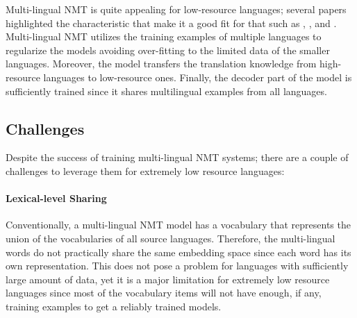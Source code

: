 Multi-lingual NMT is quite appealing for low-resource languages; several papers highlighted  the characteristic that make it a good fit for that  such as  , ,  and . Multi-lingual NMT utilizes the training examples of multiple languages to regularize the models  avoiding over-fitting to the limited data of the smaller languages. Moreover, the model transfers the translation knowledge from high-resource languages to low-resource ones. Finally, the decoder part of the model is sufficiently trained  since it shares  multilingual examples from all languages.

\subsection{Challenges}
Despite the success of training multi-lingual NMT systems; there are a couple of challenges to leverage them for extremely low resource languages:

\paragraph{Lexical-level Sharing} Conventionally, a multi-lingual NMT model has a vocabulary that represents the union of the vocabularies of all source languages. Therefore, the multi-lingual words do not practically share the same embedding space since each word has its own representation. This does not pose a problem for languages  with sufficiently large amount of  data, yet it is a major limitation for extremely low resource languages since most of the vocabulary items will not have enough, if any, training examples to get a reliably trained models.

